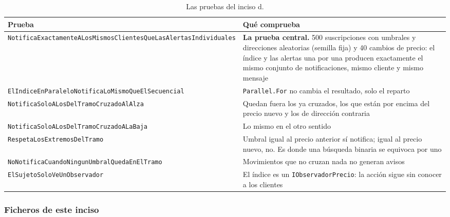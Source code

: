 \begin{table}[H]
\centering
\small
\begin{tabularx}{\textwidth}{>{\raggedright\arraybackslash}p{6.1cm} >{\raggedright\arraybackslash}X}
\toprule
\textbf{Prueba} & \textbf{Qué comprueba} \\
\midrule
\texttt{NotificaExactamenteALosMismos\-ClientesQueLasAlertasIndividuales} &
\textbf{La prueba central.} 500 suscripciones con umbrales y direcciones aleatorias (semilla
fija) y 40 cambios de precio: el índice y las alertas una por una producen exactamente el
mismo conjunto de notificaciones, mismo cliente y mismo mensaje \\
\texttt{ElIndiceEnParaleloNotificaLo\-MismoQueElSecuencial} & \texttt{Parallel.For} no cambia el resultado, solo el reparto \\
\texttt{NotificaSoloALosDelTramo\-CruzadoAlAlza} & Quedan fuera los ya cruzados, los que están por encima del precio nuevo y los de dirección contraria \\
\texttt{NotificaSoloALosDelTramo\-CruzadoALaBaja} & Lo mismo en el otro sentido \\
\texttt{RespetaLosExtremosDelTramo} & Umbral igual al precio anterior sí notifica; igual al precio nuevo, no. Es donde una búsqueda binaria se equivoca por uno \\
\texttt{NoNotificaCuandoNingunUmbral\-QuedaEnElTramo} & Movimientos que no cruzan nada no generan avisos \\
\texttt{ElSujetoSoloVeUnObservador} & El índice es un \texttt{IObservadorPrecio}: la acción sigue sin conocer a los clientes \\
\bottomrule
\end{tabularx}
\caption{Las pruebas del inciso d.}
\end{table}

\subsubsection{Ficheros de este inciso}

